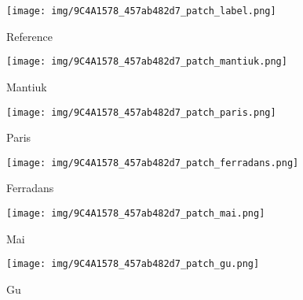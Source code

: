 \documentclass[journal]{IEEEtran}
\begin{document}
\begin{figure*}[t]
        \centering
        \begin{subfigure}[b]{0.24\textwidth}  
            \centering 
            \texttt{[image: img/9C4A1578\_457ab482d7\_patch\_label.png]}
            \caption[]%
            {{\small Reference }}    
            \label{fig:mean and std of net24}
        \end{subfigure}
        \begin{subfigure}[b]{0.24\textwidth}  
            \centering 
            \texttt{[image: img/9C4A1578\_457ab482d7\_patch\_mantiuk.png]}
            \caption[]%
            {{\small Mantiuk \cite{mantiuk2008display} }}    
            \label{fig:mean and std of net24}
        \end{subfigure}
        \begin{subfigure}[b]{0.24\textwidth}   
            \centering 
            \texttt{[image: img/9C4A1578\_457ab482d7\_patch\_paris.png]}
            \caption[]%
            {{\small Paris \cite{paris2015local} }}    
            \label{fig:mean and std of net34}
        \end{subfigure}
        \begin{subfigure}[b]{0.24\textwidth}   
            \centering 
            \texttt{[image: img/9C4A1578\_457ab482d7\_patch\_ferradans.png]}
            \caption[]%
            {{\small Ferradans \cite{ferradans2011analysis}     }}    
            \label{fig:mean and std of net44}
        \end{subfigure}
        \label{fig:mean and std of nets}
        \centering
        \begin{subfigure}[b]{0.24\textwidth}
            \centering
            \texttt{[image: img/9C4A1578\_457ab482d7\_patch\_mai.png]}
            \caption[]%
            {{\small Mai \cite{mai2011optimizing} }}    
            \label{fig:mean and std of net14}
        \end{subfigure}
        \begin{subfigure}[b]{0.24\textwidth}
            \centering
            \texttt{[image: img/9C4A1578\_457ab482d7\_patch\_gu.png]}
            \caption[]%
            {{\small Gu \cite{gu2013local} }}    
            \label{fig:mean and std of net14}

\end{subfigure}
\end{figure*}
\end{document}
